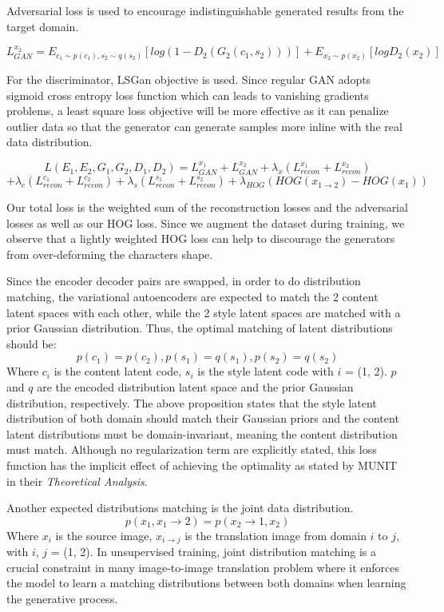 \documentclass[12pt]{report}
\begin{document}
Adversarial loss is used to encourage indistinguishable generated results from the target domain.

\[L^{x_2}_{GAN} = E_{c_1\sim p(c_1), s_2\sim q(s_2)}[log(1 - D_2(G_2(c_1, s_2)))] + E_{x_2\sim p(x_2)}[log D_2(x_2)]\]

For the discriminator, LSGan objective \cite{ls-gan} is used. Since regular GAN adopts sigmoid cross entropy loss function which can leads to vanishing gradients problems, a least square loss objective will be more effective as it can penalize outlier data so that the generator can generate samples more inline with the real data distribution.

\[L(E_1, E_2, G_1, G_2, D_1, D_2) = L^{x_1}_{GAN} + L^{x_2}_{GAN} + {\lambda}_x(L^{x_1}_{recon} + L^{x_2}_{recon}) \]
\[+ {\lambda}_c(L^{c_1}_{recon} + L^{c_2}_{recon}) + {\lambda}_s(L^{s_1}_{recon} + L^{s_2}_{recon}) + {\lambda}_{HOG}(HOG(x_{1\rightarrow 2}) - HOG(x_1))\]
 
Our total loss is the weighted sum of the reconstruction losses and the adversarial losses as well as our HOG loss. Since we augment the dataset during training, we observe that a lightly weighted HOG loss can help to discourage the generators from over-deforming the characters shape.

Since the encoder decoder pairs are swapped, in order to do distribution matching, the variational autoencoders are expected to match the 2 content latent spaces with each other, while the 2 style latent spaces are matched with a prior Gaussian distribution. Thus, the optimal matching of latent distributions should be:
\[p(c_1) = p(c_2), p(s_1) = q(s_1), p(s_2) = q(s_2)\]
Where $c_i$ is the content latent code, $s_i$ is the style latent code with $i$ = (1, 2). $p$ and $q$ are the encoded distribution latent space and the prior Gaussian distribution, respectively. The above proposition states that the style latent distribution of both domain should match their Gaussian priors and the content latent distributions must be domain-invariant, meaning the content distribution must match. Although no regularization term are explicitly stated, this loss function has the implicit effect of achieving the optimality as stated by MUNIT\cite{munit} in their \textit{Theoretical Analysis}.

Another expected distributions matching is the joint data distribution.
\[p(x_1, x_1\rightarrow2) = p(x_2\rightarrow1, x_2)\]
Where $x_i$ is the source image, $x_{i\rightarrow j}$ is the translation image from domain $i$ to $j$, with $i$, $j$ = (1, 2). In unsupervised training, joint distribution matching is a crucial constraint in many image-to-image translation problem where it enforces the model to learn a matching distributions between both domains when learning the generative process.
\end{document}
